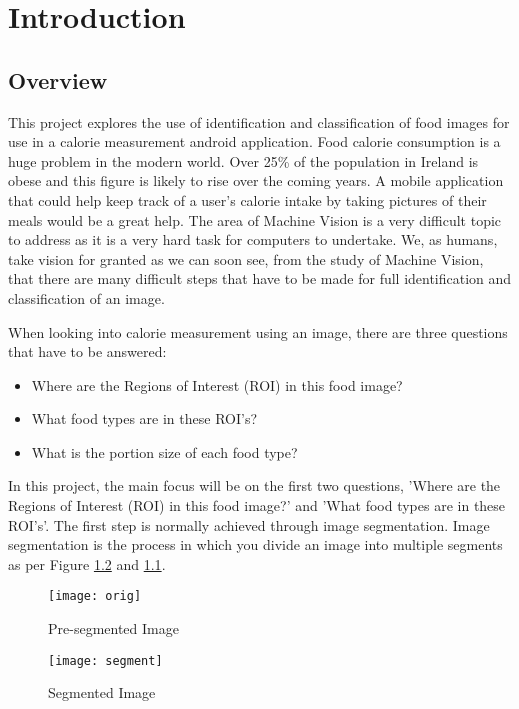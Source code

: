\chapter{Introduction}
\label{intro}

\section{Overview}
This project explores the use of identification and classification of food images for use in a calorie measurement android application.
Food calorie consumption is a huge problem in the modern world.
Over 25\% of the population in Ireland is obese and this figure is likely to rise over the coming years.
A mobile application that could help keep track of a user's calorie intake by taking pictures of their meals would be a great help.
The area of Machine Vision is a very difficult topic to address as it is a very hard task for computers to undertake.
We, as humans, take vision for granted as we can soon see, from the study of Machine Vision, that there are many difficult steps that have to be made for full identification and classification of an image.

When looking into calorie measurement using an image, there are three questions that have to be answered:
\begin{itemize}
	\item{Where are the Regions of Interest (ROI) in this food image?}
	\item{What food types are in these ROI's?}
	\item{What is the portion size of each food type?}
\end{itemize}

In this project, the main focus will be on the first two questions, 'Where are the
Regions of Interest (ROI) in this food image?' and 'What food types are in these ROI's'. The first step is normally achieved through image segmentation. Image segmentation is the process in which you divide an image into multiple segments as per Figure \ref{fig:imageSeg} and \ref{fig:preImageSeg}.

\begin{figure}
	\texttt{[image: orig]}
	\caption{Pre-segmented Image}
	\label{fig:preImageSeg}
\end{figure}

\begin{figure}
	\texttt{[image: segment]}
	\caption{Segmented Image}
	\label{fig:imageSeg}
\end{figure}


